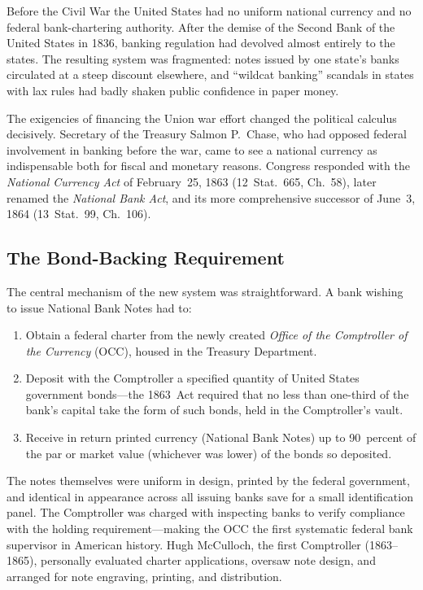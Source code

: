 \documentclass[12pt]{article}
\begin{document}
Before the Civil War the United States had no uniform national currency and no
federal bank-chartering authority.  After the demise of the Second Bank of the
United States in 1836, banking regulation had devolved almost entirely to the states.
The resulting system was fragmented: notes issued by one state's banks circulated at a
steep discount elsewhere, and ``wildcat banking'' scandals in states with lax rules
had badly shaken public confidence in paper money.

The exigencies of financing the Union war effort changed the political calculus
decisively.  Secretary of the Treasury Salmon P.\ Chase, who had opposed federal
involvement in banking before the war, came to see a national currency as
indispensable both for fiscal and monetary reasons.  Congress responded with the
\emph{National Currency Act} of February~25, 1863 (12~Stat.\ 665, Ch.\ 58), later
renamed the \emph{National Bank Act}, and its more comprehensive successor of
June~3, 1864 (13~Stat.\ 99, Ch.\ 106).

\subsection{The Bond-Backing Requirement}

The central mechanism of the new system was straightforward.  A bank wishing to
issue National Bank Notes had to:
\begin{enumerate}
  \item Obtain a federal charter from the newly created \emph{Office of the
    Comptroller of the Currency} (OCC), housed in the Treasury Department.
  \item Deposit with the Comptroller a specified quantity of United States
    government bonds---the 1863~Act required that no less than one-third of the
    bank's capital take the form of such bonds, held in the Comptroller's vault.
  \item Receive in return printed currency (National Bank Notes) up to 90~percent
    of the par or market value (whichever was lower) of the bonds so deposited.
\end{enumerate}

The notes themselves were uniform in design, printed by the federal government, and
identical in appearance across all issuing banks save for a small identification
panel.  The Comptroller was charged with inspecting banks to verify compliance with
the holding requirement---making the OCC the first systematic federal bank
supervisor in American history.  Hugh McCulloch, the first Comptroller
(1863--1865), personally evaluated charter applications, oversaw note design, and
arranged for note engraving, printing, and distribution.
\end{document}
